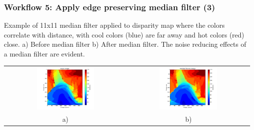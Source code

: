 \documentclass[19pt]{beamer}
\begin{document}
\begin{frame}
\frametitle{Workflow 5: Apply edge preserving median filter (3)}

\vspace*{15pt}
Example of 11x11 median filter applied to disparity map where the colors correlate with distance, with cool colors (blue) are far away and hot colors (red) close. a) Before median filter b) After median filter. 
The noise reducing effects of a median filter are evident.

\begin{center}
\begin{tabular}{cc}
\includegraphics[width=0.49\textwidth, trim=60 10 25 10, clip]{images/median1.png} &
\includegraphics[width=0.49\textwidth, trim=60 10 25 10, clip]{images/median2.png}\\[2pt]
a) & b) \\
\end{tabular}
\end{center}

\end{frame}
\end{document}
